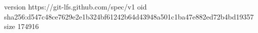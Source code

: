 version https://git-lfs.github.com/spec/v1
oid sha256:d547c48ce7629e2e1b324bf61242b64d43948a501c1ba47e882ed72b4bd19357
size 174916
